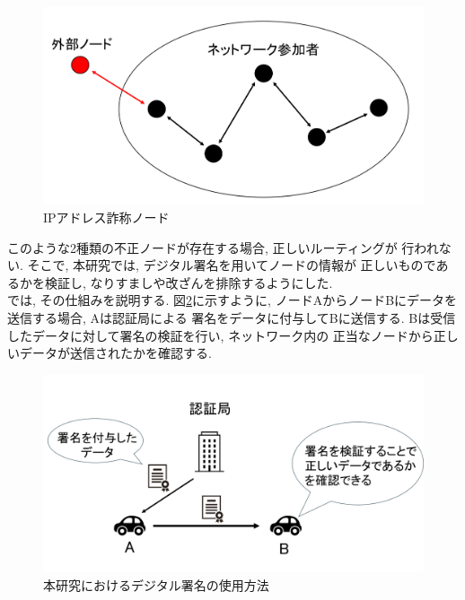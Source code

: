 \begin{figure}
  \centering
  \includegraphics[scale=0.6]{figures/ip-liar.png}
  \caption{IPアドレス詐称ノード}
  \label{fig:ip-liar}
\end{figure}

\indent このような2種類の不正ノードが存在する場合, 正しいルーティングが
行われない. そこで, 本研究では, デジタル署名を用いてノードの情報が
正しいものであるかを検証し, なりすましや改ざんを排除するようにした. \\
\indent では, その仕組みを説明する. 図\ref{fig:signature-method}に示すように, 
ノードAからノードBにデータを送信する場合, Aは認証局による
署名をデータに付与してBに送信する. 
Bは受信したデータに対して署名の検証を行い, ネットワーク内の
正当なノードから正しいデータが送信されたかを確認する.
\newpage

\begin{figure}
  \centering
  \includegraphics[scale=0.6]{figures/signature-method.png}
  \caption{本研究におけるデジタル署名の使用方法}
  \label{fig:signature-method}
\end{figure}

